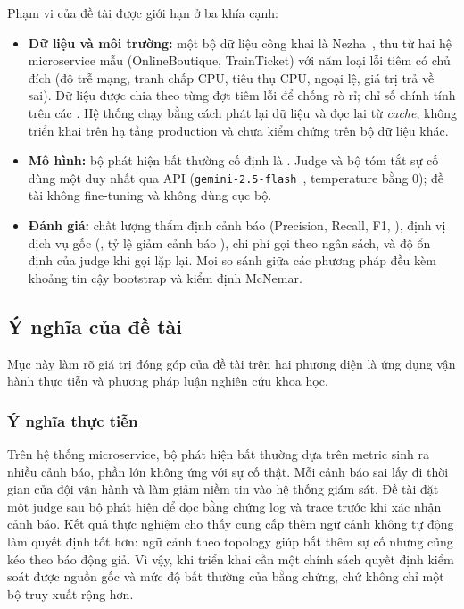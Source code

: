 Phạm vi của đề tài được giới hạn ở ba khía cạnh:
\begin{itemize}[label=--]
    \item \textbf{Dữ liệu và môi trường:} một bộ dữ liệu công khai là Nezha~\cite{nezha}, thu từ hai hệ microservice
mẫu (OnlineBoutique, TrainTicket) với năm loại lỗi tiêm có chủ đích (độ trễ mạng, tranh chấp CPU,
tiêu thụ CPU, ngoại lệ, giá trị trả về sai). Dữ liệu được chia theo từng đợt tiêm lỗi để chống
rò rỉ; chỉ số chính tính trên các . Hệ thống chạy bằng cách phát lại dữ liệu
và đọc lại từ \textit{cache}, không triển khai trên hạ tầng production và chưa kiểm chứng trên
bộ dữ liệu khác.

    \item \textbf{Mô hình:} bộ phát hiện bất thường cố định là . Judge và bộ tóm tắt
    sự cố dùng một  duy nhất qua API (\texttt{gemini-2.5-flash}~\cite{google2026gemini}, temperature bằng 0); đề tài không
    fine-tuning và không dùng  cục bộ.

    \item \textbf{Đánh giá:} chất lượng thẩm định cảnh báo (Precision, Recall, F1, ), định vị
    dịch vụ gốc (, tỷ lệ giảm cảnh báo ), chi phí gọi  theo ngân sách, và độ ổn định
    của judge khi gọi lặp lại. Mọi so sánh giữa các phương pháp đều kèm khoảng tin cậy bootstrap
    và kiểm định McNemar.
\end{itemize}

\subsection{Ý nghĩa của đề tài}
\label{subsec:significance}

Mục này làm rõ giá trị đóng góp của đề tài trên hai phương diện là ứng dụng vận hành thực tiễn và phương pháp luận nghiên cứu khoa học.

\subsubsection{Ý nghĩa thực tiễn}
\label{subsubsec:practical_significance}

Trên hệ thống microservice, bộ phát hiện bất thường dựa trên metric sinh ra nhiều cảnh báo, phần lớn không ứng với sự cố thật. Mỗi cảnh báo sai lấy đi thời gian của đội vận hành và làm giảm niềm tin vào hệ thống giám sát. Đề tài đặt một judge  sau bộ phát hiện để đọc bằng chứng log và trace trước khi xác nhận cảnh báo. Kết quả thực nghiệm cho thấy cung cấp thêm ngữ cảnh không tự động làm quyết định tốt hơn: ngữ cảnh theo topology giúp bắt thêm sự cố nhưng cũng kéo theo báo động giả. Vì vậy, khi triển khai cần một chính sách quyết định kiểm soát được nguồn gốc và mức độ bất thường của bằng chứng, chứ không chỉ một bộ truy xuất rộng hơn.

